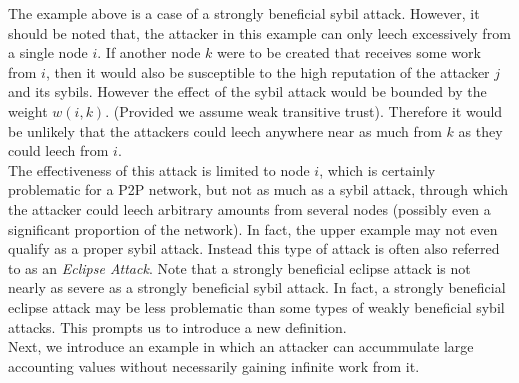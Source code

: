 \documentclass[11pt,a4paper]{article}
\theoremstyle{definition}
\theoremstyle{theorem}
\theoremstyle{proposition}
\theoremstyle{corollary}
\theoremstyle{lemma}
\theoremstyle{example}
\theoremstyle{remark}
\begin{document}
\noindent{}The example above is a case of a strongly beneficial sybil attack. However, it should be noted that, the attacker in this example can only leech excessively from a single node $i$. If another node $k$ were to be created that receives some work from $i$, then it would also be susceptible to the high reputation of the attacker $j$ and its sybils. However the effect of the sybil attack would be bounded by the weight $w(i,k)$. (Provided we assume weak transitive trust). Therefore it would be unlikely that the attackers could leech anywhere near as much from $k$ as they could leech from $i$. \vspace{1em}\\

\noindent{}The effectiveness of this attack is limited to node $i$, which is certainly problematic for a P2P network, but not as much as a sybil attack, through which the attacker could leech arbitrary amounts from several nodes (possibly even a significant proportion of the network). In fact, the upper example may not even qualify as a proper sybil attack. Instead this type of attack is often also referred to as an {\it Eclipse Attack}. Note that a strongly beneficial eclipse attack is not nearly as severe as a strongly beneficial sybil attack. In fact, a strongly beneficial eclipse attack may be less problematic than some types of weakly beneficial sybil attacks. This prompts us to introduce a new definition.\vspace{1em}\\

\noindent{}Next, we introduce an example in which an attacker can accummulate large accounting values without necessarily gaining infinite work from it.
\end{document}
